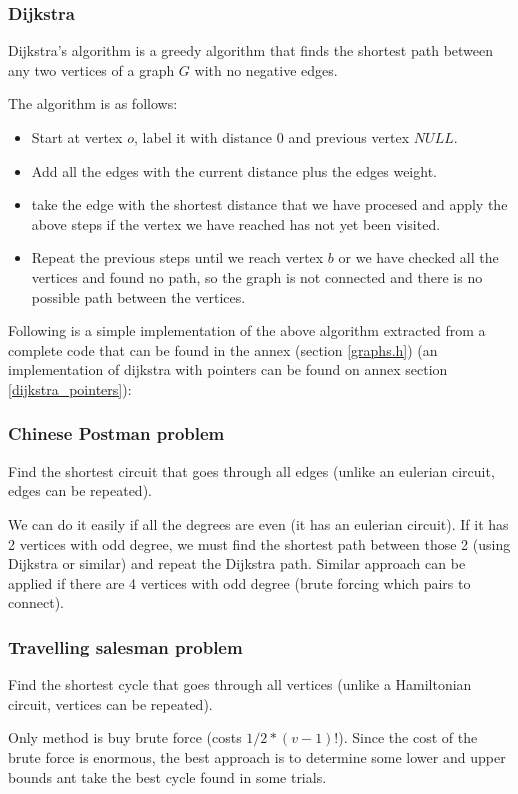 \documentclass[11pt,twoside]{article}
\theoremstyle{defi}
\begin{document}
\subsubsection{Dijkstra}
\begin{definitionii}
Dijkstra’s algorithm is a greedy algorithm that finds the shortest path between any two vertices of a graph $G$ with no negative edges.
\end{definitionii}
The algorithm is as follows:
\begin{itemize}
\item Start at vertex $o$, label it with distance 0 and previous vertex $NULL$.
\item Add all the edges with the current distance plus the edges weight.
\item take the edge with the shortest distance that we have procesed and apply the above steps if the vertex we have reached has not yet been visited.
\item Repeat the previous steps until we reach vertex $b$ or we have checked all the vertices and found no path, so the graph is not connected and there is no possible path between the vertices.
\end{itemize}
Following is a simple implementation of the above algorithm extracted from a complete code that can be found in the annex (section \ref{graphs.h}) (an implementation of dijkstra with pointers can be found on annex section \ref{dijkstra_pointers}):


\newpage

\subsubsection{Chinese Postman problem}
\begin{definitionii}
Find the shortest circuit that goes through all edges (unlike an eulerian circuit, edges can be repeated).\end{definitionii}
We can do it easily if all the degrees are even (it has an eulerian circuit). If it has 2 vertices with odd degree, we must find the shortest path between those 2 (using Dijkstra or similar) and repeat the Dijkstra path. Similar approach can be applied if there are 4 vertices with odd degree (brute forcing which pairs to connect).

\subsubsection{Travelling salesman problem}
\begin{definitionii}
Find the shortest cycle that goes through all vertices (unlike a Hamiltonian circuit, vertices can be repeated).
\end{definitionii}
Only method is buy brute force (costs $1/2*(v-1)!$). Since the cost of the brute force is enormous, the best approach is to determine some lower and upper bounds ant take the best cycle found in some trials.
\end{document}
